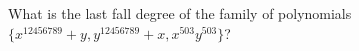 What is the last fall degree of the family of polynomials $\{x^{12456789}+y,y^{12456789}+x,x^{503}y^{503}\}$?
